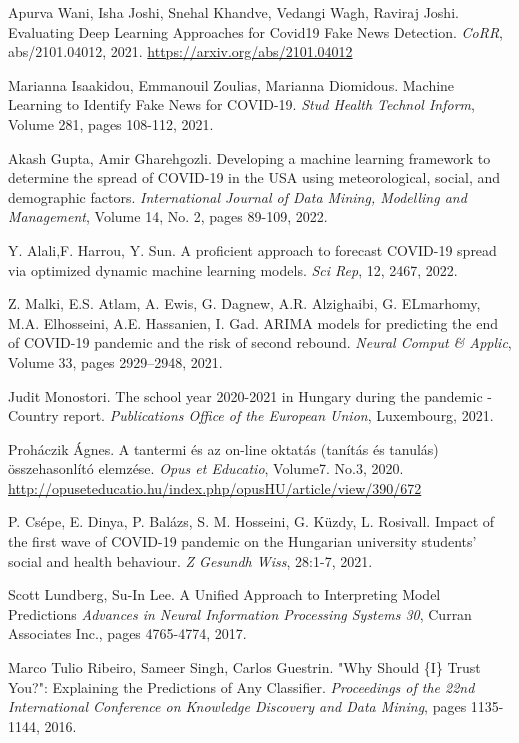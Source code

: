 \documentclass[12pt]{article}
\begin{document}
\begin{thebibliography}{9}
 Apurva Wani, Isha Joshi, Snehal Khandve, Vedangi Wagh, Raviraj Joshi. Evaluating Deep Learning Approaches for Covid19 Fake News Detection. \textit{CoRR}, abs/2101.04012, 2021. \href{https://arxiv.org/abs/2101.04012}{https://arxiv.org/abs/2101.04012}

 Marianna Isaakidou, Emmanouil Zoulias, Marianna Diomidous. Machine Learning to Identify Fake News for COVID-19. \textit{Stud Health Technol Inform}, Volume 281, pages 108-112, 2021.

Akash Gupta, Amir Gharehgozli. Developing a machine learning framework to determine the spread of COVID-19 in the USA using meteorological, social, and demographic factors. \textit{International Journal of Data Mining, Modelling and Management}, Volume 14, No. 2, pages 89-109, 2022.

Y. Alali,F. Harrou, Y. Sun. A proficient approach to forecast COVID-19 spread via optimized dynamic machine learning models. \textit{Sci Rep}, 12, 2467, 2022.

Z. Malki, E.S. Atlam, A. Ewis, G. Dagnew, A.R. Alzighaibi, G. ELmarhomy, M.A. Elhosseini, A.E. Hassanien, I. Gad.
ARIMA models for predicting the end of COVID-19 pandemic and the risk of second rebound. \textit{Neural Comput \& Applic}, Volume 33, pages 2929–2948, 2021.

 Judit Monostori. The school year 2020-2021 in Hungary during the pandemic - Country report. \textit{Publications Office of the European Union}, Luxembourg, 2021.

 Proháczik Ágnes. A tantermi és az on-line oktatás (tanítás és tanulás) összehasonlító elemzése. \textit{Opus et Educatio}, Volume7. No.3, 2020. \url{http://opuseteducatio.hu/index.php/opusHU/article/view/390/672}

P. Csépe, E. Dinya, P. Balázs, S. M. Hosseini, G. Küzdy, L. Rosivall. Impact of the first wave of COVID-19 pandemic on the Hungarian university students' social and health behaviour. \textit{Z Gesundh Wiss},  28:1-7, 2021.

Scott Lundberg, Su-In Lee. A Unified Approach to Interpreting Model Predictions \textit{Advances in Neural Information Processing Systems 30}, Curran Associates Inc., pages 4765-4774, 2017.

Marco Tulio Ribeiro, Sameer Singh, Carlos Guestrin. "Why Should \{I\} Trust You?": Explaining the Predictions of Any Classifier. \textit{Proceedings of the 22nd International Conference on Knowledge Discovery and Data Mining}, pages 1135-1144, 2016.

\end{thebibliography}
\end{document}
